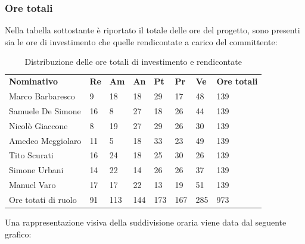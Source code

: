     \subsubsection{Ore totali}
        Nella tabella sottostante è riportato il totale delle ore del progetto, sono presenti sia le ore di investimento che quelle rendicontate a carico del committente:
            \begin{center}
                \begin{table}[ht!]
                    \centering\caption{Distribuzione delle ore totali di investimento e rendicontate}
                    \vspace{5px}
                    \renewcommand{\arraystretch}{1.8}
                    \begin{tabular}{p{100px} p{20px} p{20px} p{20px} p{20px} p{20px} p{20px} p{50px} }
                        \rowcolor{logo!70} \textbf{Nominativo} & \textbf{Re} & \textbf{Am} & \textbf{An} & \textbf{Pt} & \textbf{Pr} & \textbf{Ve} & \textbf{Ore totali}\\
                        Marco Barbaresco & 9 & 18 & 18 & 29 & 17 & 48 & 139\\
                        Samuele De Simone & 16 & 8 & 27 & 18 & 26 & 44 & 139\\
                        Nicolò Giaccone & 8 & 19 & 27 & 29 & 26 & 30 & 139\\
                        Amedeo Meggiolaro & 11 & 5 & 18 & 33 & 23 & 49 & 139\\
                        Tito Scurati & 16 & 24 & 18 & 25 & 30 & 26 & 139\\
                        Simone Urbani & 14 & 22 & 14 & 26 & 26 & 37 & 139\\
                        Manuel Varo & 17 & 17 & 22 & 13 & 19 & 51 & 139\\
                        Ore totati di ruolo & 91 & 113 & 144 & 173 & 167 & 285 & 973\\
                    \end{tabular}
                \end{table}
            \end{center}
            \pagebreak
            Una rappresentazione visiva della suddivisione oraria viene data dal seguente grafico:


